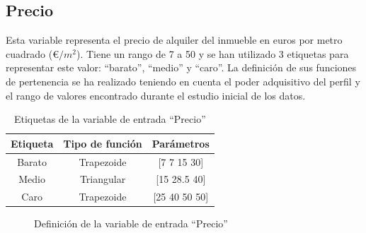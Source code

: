 \documentclass[12pt]{report} %
\begin{document}
        \subsection{Precio}
        Esta variable representa el precio de alquiler del inmueble en euros por metro cuadrado (€$/m^2$).
        Tiene un rango de 7 a 50 y se han utilizado 3 etiquetas para representar este valor: ``barato'', ``medio'' y ``caro''.
        La definición de sus funciones de pertenencia se ha realizado teniendo en cuenta el poder adquisitivo del perfil
         y el rango de valores encontrado durante el estudio inicial de los datos.

        \begin{table}[h]
            \center
            \begin{tabular}{@{}ccc@{}}
                \toprule
                \textbf{Etiqueta} & \textbf{Tipo de función} & \textbf{Parámetros} \\
                \midrule
                Barato & Trapezoide & [7 7 15 30]   \\
                Medio  & Triangular & [15 28.5 40]  \\
                Caro   & Trapezoide & [25 40 50 50] \\
                \bottomrule
            \end{tabular}
            \caption{Etiquetas de la variable de entrada ``Precio''}
        \end{table}

        \begin{figure}[H]
            \centering
            \caption{Definición de la variable de entrada ``Precio''}
        \end{figure}
\end{document}

